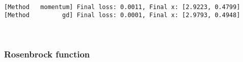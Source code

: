\documentclass[11pt]{article}
\begin{document}
    \begin{center}
    \end{center}
    { \hspace*{\fill} \\}
    
    \begin{center}
    \end{center}
    { \hspace*{\fill} \\}
    
    \begin{center}
    \end{center}
    { \hspace*{\fill} \\}
    
    \begin{Verbatim}[commandchars=\\\{\}]
[Method   momentum] Final loss: 0.0011, Final x: [2.9223, 0.4799]
[Method         gd] Final loss: 0.0001, Final x: [2.9793, 0.4948]

    \end{Verbatim}

    \begin{center}
    \end{center}
    { \hspace*{\fill} \\}
    
    \subsubsection{Rosenbrock function}\label{rosenbrock-function}
\end{document}
